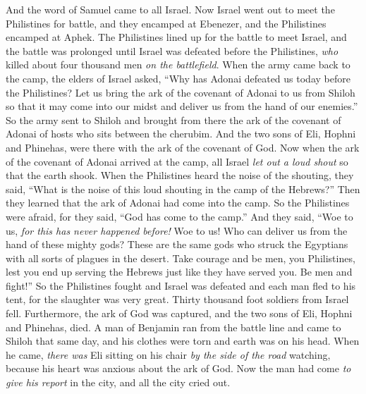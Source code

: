 \begin{biblechapter} %
 And the word of Samuel came to all Israel. Now Israel went out to meet the Philistines for battle, and they encamped at Ebenezer, and the Philistines encamped at Aphek.
\verse The Philistines lined up for the battle to meet Israel, and the battle was prolonged until Israel was defeated before the Philistines, \textit{who} killed about four thousand men \textit{on the battlefield}.
\verse When the army came back to the camp, the elders of Israel asked, “Why has Adonai defeated us today before the Philistines? Let us bring the ark of the covenant of Adonai to us from Shiloh so that it may come into our midst and deliver us from the hand of our enemies.”
\verse So the army sent to Shiloh and brought from there the ark of the covenant of Adonai of hosts who sits between the cherubim. And the two sons of Eli, Hophni and Phinehas, were there with the ark of the covenant of God.
\verse Now when the ark of the covenant of Adonai arrived at the camp, all Israel \textit{let out a loud shout} so that the earth shook.
\verse When the Philistines heard the noise of the shouting, they said, “What is the noise of this loud shouting in the camp of the Hebrews?” Then they learned that the ark of Adonai had come into the camp.
\verse So the Philistines were afraid, for they said, “God has come to the camp.” And they said, “Woe to us, \textit{for this has never happened before!}
\verse Woe to us! Who can deliver us from the hand of these mighty gods? These are the same gods who struck the Egyptians with all sorts of plagues in the desert.
\verse Take courage and be men, you Philistines, lest you end up serving the Hebrews just like they have served you. Be men and fight!”
\verse So the Philistines fought and Israel was defeated and each man fled to his tent, for the slaughter was very great. Thirty thousand foot soldiers from Israel fell.
\verse Furthermore, the ark of God was captured, and the two sons of Eli, Hophni and Phinehas, died.
\verse A man of Benjamin ran from the battle line and came to Shiloh that same day, and his clothes were torn and earth was on his head.
\verse When he came, \textit{there was} Eli sitting on his chair \textit{by the side of the road} watching, because his heart was anxious about the ark of God. Now the man had come \textit{to give his report} in the city, and all the city cried out.

\end{biblechapter}
